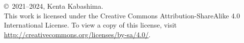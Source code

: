 \documentclass[a4j,
]{ltjsbook}
\begin{document}
\maketitle

\thispagestyle{empty}
\null\vfill %
\noindent
\copyright \ 2021--2024, Kenta Kabashima.\\
This work is licensed under the Creative Commons Attribution-ShareAlike 4.0 International License. To view a copy of this license, visit
\url{http://creativecommons.org/licenses/by-sa/4.0/}.

\setcounter{tocdepth}{2}
\tableofcontents













\appendix



\todototoc
\listoftodos




\printindex
\end{document}
